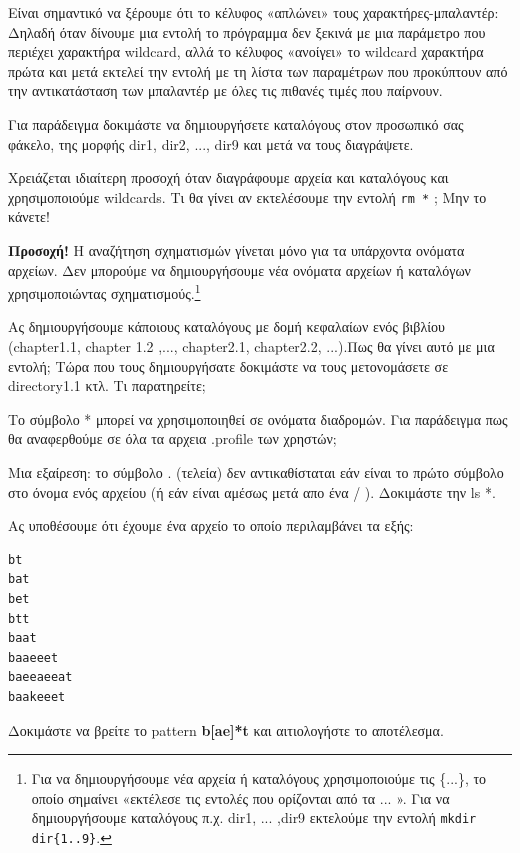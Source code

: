 Είναι σημαντικό να ξέρουμε ότι το κέλυφος «απλώνει» τους χαρακτήρες-μπαλαντέρ: Δηλαδή όταν δίνουμε μια εντολή το πρόγραμμα δεν ξεκινά με μια
παράμετρο που περιέχει χαρακτήρα wildcard, αλλά το κέλυφος «ανοίγει» το wildcard χαρακτήρα πρώτα και μετά εκτελεί την εντολή με τη λίστα των
παραμέτρων που προκύπτουν από την αντικατάσταση των μπαλαντέρ με όλες τις πιθανές τιμές που παίρνουν. 

Για παράδειγμα δοκιμάστε να δημιουργήσετε καταλόγους στον προσωπικό σας φάκελο, της μορφής dir1, dir2, ..., dir9 και μετά να τους
διαγράψετε.

Χρειάζεται ιδιαίτερη προσοχή όταν διαγράφουμε αρχεία και καταλόγους και χρησιμοποιούμε wildcards. Τι θα γίνει αν εκτελέσουμε την εντολή
\texttt{rm *} ; Μην το κάνετε!

\textbf{Προσοχή!} Η αναζήτηση σχηματισμών γίνεται μόνο για τα υπάρχοντα ονόματα αρχείων. Δεν μπορούμε να δημιουργήσουμε νέα ονόματα αρχείων
ή καταλόγων χρησιμοποιώντας σχηματισμούς.\footnote{Για να δημιουργήσουμε νέα αρχεία ή καταλόγους χρησιμοποιούμε τις \{...\}, το οποίο
	σημαίνει «εκτέλεσε τις εντολές που ορίζονται από τα ... ». Για να δημιουργήσουμε καταλόγους π.χ. dir1, ... ,dir9 εκτελούμε την εντολή
	\texttt{mkdir dir\{1..9\}}.}

Ας δημιουργήσουμε κάποιους καταλόγους με δομή κεφαλαίων ενός βιβλίου (chapter1.1, chapter 1.2 ,..., chapter2.1, chapter2.2, ...).Πως θα
γίνει αυτό με μια εντολή;
Τώρα που τους δημιουργήσατε δοκιμάστε να τους μετονομάσετε σε directory1.1 κτλ. Τι παρατηρείτε; 

Το σύμβολο * μπορεί να χρησιμοποιηθεί σε ονόματα διαδρομών. Για παράδειγμα πως θα αναφερθούμε σε όλα τα αρχεια .profile των χρηστών;


Μια εξαίρεση: το σύμβολο  .  (τελεία) δεν αντικαθίσταται εάν είναι το πρώτο σύμβολο στο όνομα ενός αρχείου (ή εάν είναι αμέσως μετά απο ένα
/ ).
Δοκιμάστε την ls *. 

Ας υποθέσουμε ότι έχουμε ένα αρχείο το οποίο περιλαμβάνει τα εξής:
\begin{lstlisting}
bt
bat
bet
btt
baat
baaeeet
baeeaeeat
baakeeet
\end{lstlisting}
Δοκιμάστε να βρείτε το pattern \textbf{b[ae]*t} και αιτιολογήστε το αποτέλεσμα.




